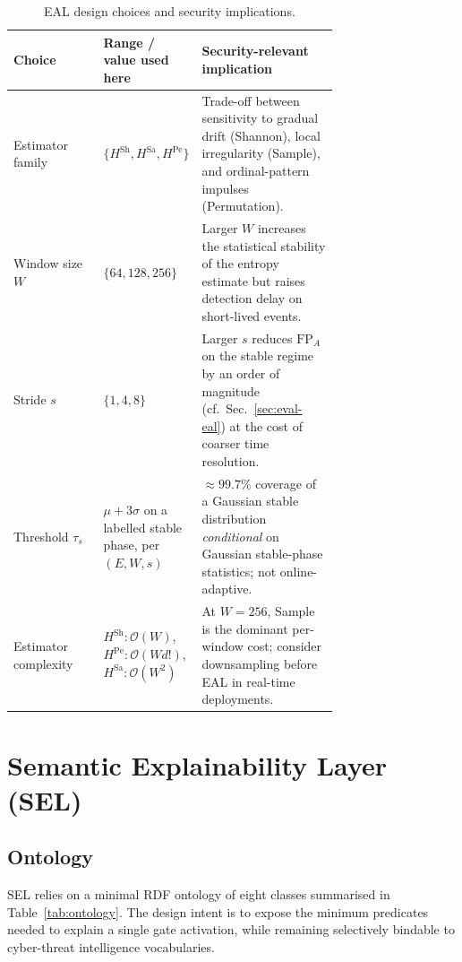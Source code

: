 \documentclass[futureinternet,article,submit,pdftex,moreauthors]{Definitions/mdpi}
\newcommand{\Hsh}{\ensuremath{H^{\mathrm{Sh}}}}
\newcommand{\Hsa}{\ensuremath{H^{\mathrm{Sa}}}}
\newcommand{\Hpe}{\ensuremath{H^{\mathrm{Pe}}}}
\newcommand{\taus}{\ensuremath{\tau_{s}}}
\begin{document}
\begin{table}[t]
\centering
\caption{EAL design choices and security implications.}
\label{tab:eal-implications}
\small
\begin{tabular}{@{}lp{0.30\linewidth}p{0.42\linewidth}@{}}
\toprule
\textbf{Choice} & \textbf{Range / value used here} & \textbf{Security-relevant implication} \\
\midrule
Estimator family & $\{\Hsh, \Hsa, \Hpe\}$ & Trade-off between sensitivity
  to gradual drift (Shannon), local irregularity (Sample), and
  ordinal-pattern impulses (Permutation). \\
Window size $W$ & $\{64, 128, 256\}$ & Larger $W$ increases the
  statistical stability of the entropy estimate but raises detection
  delay on short-lived events. \\
Stride $s$ & $\{1, 4, 8\}$ & Larger $s$ reduces $\mathrm{FP}_A$ on the
  stable regime by an order of magnitude (cf.\ Sec.~\ref{sec:eval-eal})
  at the cost of coarser time resolution. \\
Threshold $\taus$ & $\mu + 3\sigma$ on a labelled stable phase, per
  $(E, W, s)$ & $\approx 99.7\%$ coverage of a Gaussian stable
  distribution \emph{conditional} on Gaussian stable-phase statistics;
  not online-adaptive. \\
Estimator complexity & $\Hsh\!:\mathcal{O}(W)$,
  $\Hpe\!:\mathcal{O}(W d!)$, $\Hsa\!:\mathcal{O}(W^{2})$ & At $W = 256$,
  Sample is the dominant per-window cost; consider downsampling before
  EAL in real-time deployments. \\
\bottomrule
\end{tabular}
\end{table}

\section{Semantic Explainability Layer (SEL)}
\label{sec:sel}

\subsection{Ontology}

SEL relies on a minimal RDF ontology of eight classes summarised in
Table~\ref{tab:ontology}. The design intent is to expose the minimum
predicates needed to explain a single gate activation, while remaining
selectively bindable to cyber-threat intelligence vocabularies.
\end{document}
